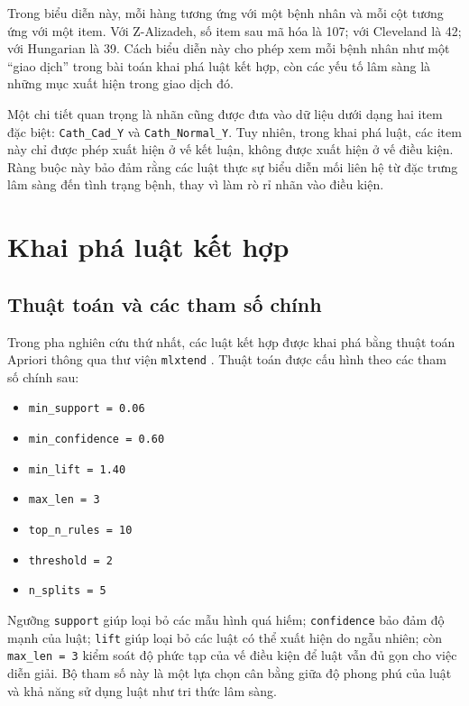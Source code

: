 \blocksep

Trong biểu diễn này, mỗi hàng tương ứng với một bệnh nhân và mỗi cột tương ứng với một item. Với Z-Alizadeh, số item sau mã hóa là 107; với Cleveland là 42; với Hungarian là 39. Cách biểu diễn này cho phép xem mỗi bệnh nhân như một “giao dịch” trong bài toán khai phá luật kết hợp, còn các yếu tố lâm sàng là những mục xuất hiện trong giao dịch đó.

\blocksep

Một chi tiết quan trọng là nhãn cũng được đưa vào dữ liệu dưới dạng hai item đặc biệt: \texttt{Cath\_Cad\_Y} và \texttt{Cath\_Normal\_Y}. Tuy nhiên, trong khai phá luật, các item này chỉ được phép xuất hiện ở vế kết luận, không được xuất hiện ở vế điều kiện. Ràng buộc này bảo đảm rằng các luật thực sự biểu diễn mối liên hệ từ đặc trưng lâm sàng đến tình trạng bệnh, thay vì làm rò rỉ nhãn vào điều kiện.

\blocksep

\section{Khai phá luật kết hợp}

\blocksep

\subsection{Thuật toán và các tham số chính}

\blocksep

Trong pha nghiên cứu thứ nhất, các luật kết hợp được khai phá bằng thuật toán Apriori \cite{Agrawal1994} thông qua thư viện \texttt{mlxtend} \cite{Raschka2018}. Thuật toán được cấu hình theo các tham số chính sau:

\renewcommand{\labelitemi}{$+$}
\begin{itemize}
	\item \texttt{min\_support = 0.06}
	\item \texttt{min\_confidence = 0.60}
	\item \texttt{min\_lift = 1.40}
	\item \texttt{max\_len = 3}
	\item \texttt{top\_n\_rules = 10}
	\item \texttt{threshold = 2}
	\item \texttt{n\_splits = 5}
\end{itemize}

\blocksep

Ngưỡng \texttt{support} giúp loại bỏ các mẫu hình quá hiếm; \texttt{confidence} bảo đảm độ mạnh của luật; \texttt{lift} giúp loại bỏ các luật có thể xuất hiện do ngẫu nhiên; còn \texttt{max\_len = 3} kiểm soát độ phức tạp của vế điều kiện để luật vẫn đủ gọn cho việc diễn giải. Bộ tham số này là một lựa chọn cân bằng giữa độ phong phú của luật và khả năng sử dụng luật như tri thức lâm sàng.


